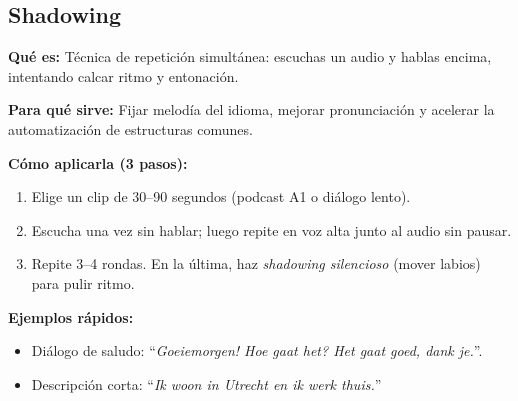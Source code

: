 \subsection*{Shadowing}
\textbf{Qué es:} Técnica de repetición simultánea: escuchas un audio y hablas encima, intentando calcar ritmo y entonación.

\textbf{Para qué sirve:} Fijar melodía del idioma, mejorar pronunciación y acelerar la automatización de estructuras comunes.

\textbf{Cómo aplicarla (3 pasos):}
\begin{enumerate}[leftmargin=*]
	\item Elige un clip de 30--90 segundos (podcast A1 o diálogo lento).
	\item Escucha una vez sin hablar; luego repite en voz alta junto al audio sin pausar.
	\item Repite 3--4 rondas. En la última, haz \emph{shadowing silencioso} (mover labios) para pulir ritmo.
\end{enumerate}

\textbf{Ejemplos rápidos:}
\begin{itemize}[leftmargin=*]
	\item Diálogo de saludo: ``\textit{Goeiemorgen! Hoe gaat het? Het gaat goed, dank je.}''.
	\item Descripción corta: ``\textit{Ik woon in Utrecht en ik werk thuis.}''
\end{itemize}
